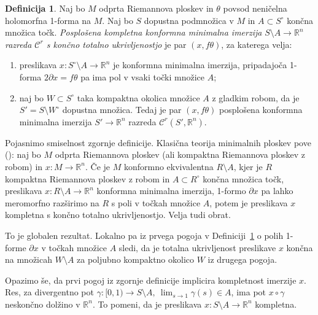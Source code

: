 \documentclass[12pt,a4paper,twoside]{article}
\theoremstyle{definition} %
\newtheorem{definicija}{Definicija}[section]
\theoremstyle{plain} %
\numberwithin{equation}{section}  %
\newcommand{\R}{\mathbb R}
\begin{document}
\begin{definicija} \label{def:GCCMI-FTC}
Naj bo $M$ odprta Riemannova ploskev in $\theta$ povsod neničelna holomorfna 1-forma na $M$. Naj bo $S$ dopustna podmnožica v $M$ in $A \subset S^{\circ}$ končna množica točk. \emph{Posplošena kompletna konformna minimalna imerzija} $S \setminus A \to \mathbb{R}^{n}$ \emph{razreda $\mathcal{C}^{r}$ s končno totalno ukrivljenostjo} je par $(x, f\theta)$, za katerega velja:
\begin{enumerate}
\item preslikava $x \colon S^{\circ} \setminus A \to \mathbb{R}^{n}$ je konformna minimalna imerzija, pripadajoča 1-forma
	$2 \partial x = f\theta$ pa ima pol v vsaki točki množice $A$;
\item naj bo $W \subset S^{\circ}$ taka kompaktna okolica množice $A$ z gladkim robom, da je $S' = S \setminus W^{\circ}$ dopustna množica. Tedaj je par
	$(x, f\theta)$ posplošena konformna minimalna imerzija $S' \to \mathbb{R}^{n}$ razreda $\mathcal{C}^{r}(S', \mathbb{R}^{n})$.
\end{enumerate}
\end{definicija}

Pojasnimo smiselnost zgornje definicije. Klasična teorija minimalnih ploskev pove (\cite[str.~8]{alarcon2019algebraic}):
naj bo $M$ odprta Riemannova ploskev (ali kompaktna Riemannova ploskev z robom) in $x \colon M \to \R^{n}$.
Če je $M$ konformno ekvivalentna $R \setminus A$, kjer je $R$ kompaktna Riemannova ploskev z robom in $A \subset R^{\circ}$ končna množica točk, preslikava $x \colon R \setminus A \to \R^{n}$ konformna minimalna imerzija, 1-formo $\partial x$ pa lahko meromorfno razširimo na $R$ s poli v točkah množice $A$, potem je preslikava $x$ kompletna s končno totalno ukrivljenostjo.
Velja tudi obrat.

To je globalen rezultat. Lokalno pa iz prvega pogoja v Definiciji~\ref{def:GCCMI-FTC} o polih 1-forme $\partial x$ v točkah množice $A$ sledi, da je totalna ukrivljenost preslikave $x$ končna na množicah $W \setminus A$ za poljubno kompaktno okolico $W$ iz drugega pogoja.

Opazimo še, da prvi pogoj iz zgornje definicije implicira kompletnost imerzije $x$. Res, za divergentno pot $\gamma \colon [0,1) \to S \setminus A, \ \lim_{s \to 1}\gamma(s) \in A$, ima pot $x \circ \gamma$ neskončno dolžino v $\R^{n}$. To pomeni, da je preslikava $x \colon S \setminus A \to \R^{n}$ kompletna. \newline
\end{document}
